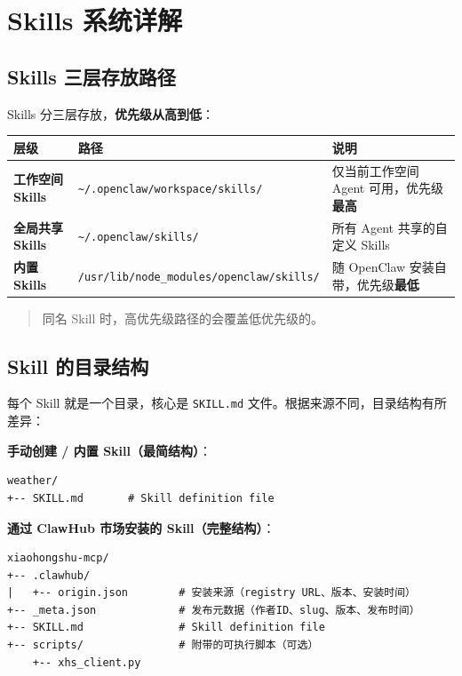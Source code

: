 \hrulefill

\section{Skills 系统详解}


\subsection{Skills 三层存放路径}


Skills 分三层存放，\textbf{优先级从高到低}：

\begin{table}[h]
\centering
\small
\begin{tabular}{|l|l|l|}
\hline
层级 & 路径 & 说明 \\
\hline
\textbf{工作空间 Skills} & \texttt{\textasciitilde{}/.openclaw/workspace/skills/} & 仅当前工作空间 Agent 可用，优先级\textbf{最高} \\
\hline
\textbf{全局共享 Skills} & \texttt{\textasciitilde{}/.openclaw/skills/} & 所有 Agent 共享的自定义 Skills \\
\hline
\textbf{内置 Skills} & \texttt{/usr/lib/node\_modules/openclaw/skills/} & 随 OpenClaw 安装自带，优先级\textbf{最低} \\
\hline
\end{tabular}
\end{table}

\begin{quote}
同名 Skill 时，高优先级路径的会覆盖低优先级的。
\end{quote}

\subsection{Skill 的目录结构}


每个 Skill 就是一个目录，核心是 \texttt{SKILL.md} 文件。根据来源不同，目录结构有所差异：

\textbf{手动创建 / 内置 Skill（最简结构）}：

\begin{lstlisting}
weather/
+-- SKILL.md       # Skill definition file
\end{lstlisting}

\textbf{通过 ClawHub 市场安装的 Skill（完整结构）}：

\begin{lstlisting}
xiaohongshu-mcp/
+-- .clawhub/
|   +-- origin.json        # 安装来源（registry URL、版本、安装时间）
+-- _meta.json             # 发布元数据（作者ID、slug、版本、发布时间）
+-- SKILL.md               # Skill definition file
+-- scripts/               # 附带的可执行脚本（可选）
    +-- xhs_client.py
\end{lstlisting}


